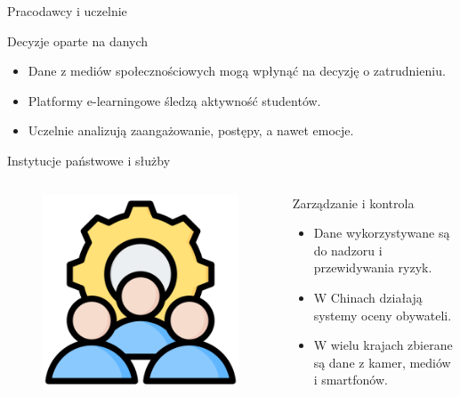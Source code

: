     \begin{frame}{Pracodawcy i uczelnie}
    \begin{alertblock}{Decyzje oparte na danych}
        \begin{itemize}
          \item Dane z mediów społecznościowych mogą wpłynąć na decyzję o zatrudnieniu.\cite{DIGITAL_GLOBAL}
          \item Platformy e-learningowe śledzą aktywność studentów.
          \item Uczelnie analizują zaangażowanie, postępy, a nawet emocje.
        \end{itemize}
    \end{alertblock}
    \end{frame}
    
    \begin{frame}{Instytucje państwowe i służby}
    \begin{columns}[c]
        \begin{figure}
          \centering
          \includegraphics[height=0.45\textheight]{images/user-management.png}
        \end{figure}
        \begin{alertblock}{Zarządzanie i kontrola}
            \begin{itemize}
              \item Dane wykorzystywane są do nadzoru i przewidywania ryzyk.
              \item W Chinach działają systemy oceny obywateli.\cite{DIGITAL_LOCAL}
              \item W wielu krajach zbierane są dane z kamer, mediów i smartfonów.
            \end{itemize}
        \end{alertblock}
    \end{columns}
    \end{frame}
    
